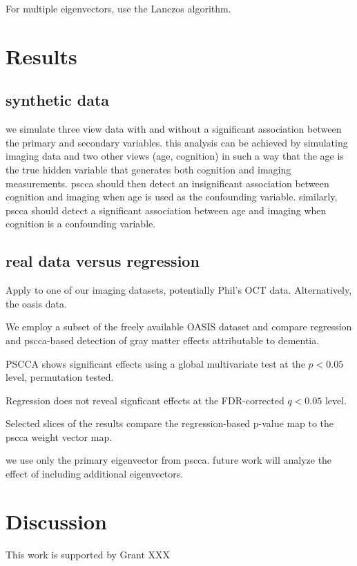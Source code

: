 \documentclass{llncs}
\begin{document}
For multiple eigenvectors, use the Lanczos algorithm.

\section{Results}
\subsection{synthetic data}
we simulate three view data with and without a significant association
between the primary and secondary variables.  this analysis can be
achieved by simulating imaging data and two other views (age,
cognition) in such a way that the age is the true hidden variable that
generates both cognition and imaging measurements.  pscca should then
detect an insignificant association between cognition and imaging when
age is used as the confounding variable.  similarly, pscca should
detect a significant association between age and imaging when
cognition is a confounding variable.   

\subsection{real data versus regression}
Apply to one of our imaging datasets, potentially Phil's OCT data.
Alternatively, the oasis data. 

We employ a subset of the freely available OASIS dataset and compare
regression and pscca-based detection of gray matter effects
attributable to dementia.

PSCCA shows significant effects using a global multivariate test at
the $p<0.05$ level, permutation tested.  

Regression does not reveal signficant effects at the FDR-corrected
$q<0.05$ level.  

Selected slices of the results compare the regression-based p-value
map to the pscca weight vector map.  

we use only the primary eigenvector from pscca.  future work will
analyze the effect of including additional eigenvectors. 

\section{Discussion}

 This work is supported by Grant XXX 


\end{document}

